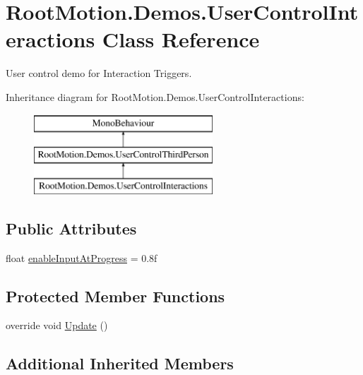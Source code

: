 \hypertarget{class_root_motion_1_1_demos_1_1_user_control_interactions}{}\section{Root\+Motion.\+Demos.\+User\+Control\+Interactions Class Reference}
\label{class_root_motion_1_1_demos_1_1_user_control_interactions}


User control demo for Interaction Triggers.  


Inheritance diagram for Root\+Motion.\+Demos.\+User\+Control\+Interactions\+:\begin{figure}[H]
\begin{center}
\leavevmode
\includegraphics[height=3.000000cm]{class_root_motion_1_1_demos_1_1_user_control_interactions}
\end{center}
\end{figure}
\subsection*{Public Attributes}
\begin{DoxyCompactItemize}
\item 
float \mbox{\hyperlink{class_root_motion_1_1_demos_1_1_user_control_interactions_ab4eb56fe0d1450117270a71f9b5d2e35}{enable\+Input\+At\+Progress}} = 0.\+8f
\end{DoxyCompactItemize}
\subsection*{Protected Member Functions}
\begin{DoxyCompactItemize}
\item 
override void \mbox{\hyperlink{class_root_motion_1_1_demos_1_1_user_control_interactions_a2d76c83d8d9a1decde791592e03561ee}{Update}} ()
\end{DoxyCompactItemize}
\subsection*{Additional Inherited Members}


